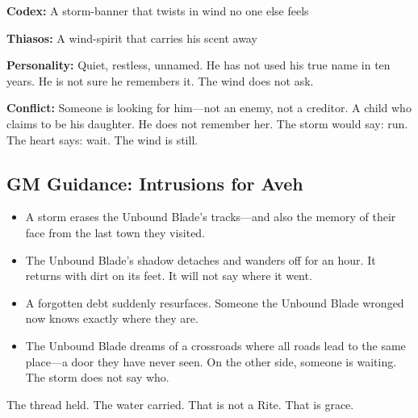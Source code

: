 \textbf{Codex:} A storm-banner that twists in wind no one else feels

\textbf{Thiasos:} A wind-spirit that carries his scent away

\textbf{Personality:} Quiet, restless, unnamed. He has not used his true name in ten years. He is not sure he remembers it. The wind does not ask.

\textbf{Conflict:} Someone is looking for him—not an enemy, not a creditor. A child who claims to be his daughter. He does not remember her. The storm would say: run. The heart says: wait. The wind is still.

\subsection{GM Guidance: Intrusions for Aveh}

\begin{itemize}
\item A storm erases the Unbound Blade's tracks—and also the memory of their face from the last town they visited.
\item The Unbound Blade's shadow detaches and wanders off for an hour. It returns with dirt on its feet. It will not say where it went.
\item A forgotten debt suddenly resurfaces. Someone the Unbound Blade wronged now knows exactly where they are.
\item The Unbound Blade dreams of a crossroads where all roads lead to the same place—a door they have never seen. On the other side, someone is waiting. The storm does not say who.
\end{itemize}

The thread held. The water carried. That is not a Rite. That is grace.
